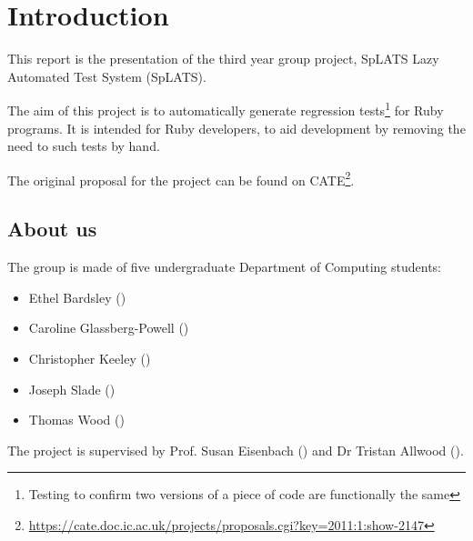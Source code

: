 \chapter{Introduction}

This report is the presentation of the third year group project, SpLATS Lazy Automated Test System (SpLATS).

The aim of this project is to automatically generate regression tests\footnote{Testing to confirm two versions of a piece of code are functionally the same} for Ruby programs.
It is intended for Ruby developers, to aid development by removing the need to such tests by hand.

The original proposal for the project can be found on CATE\footnote{\url{https://cate.doc.ic.ac.uk/projects/proposals.cgi?key=2011:1:show-2147}}.

\section{About us}
  The group is made of five undergraduate Department of Computing students:
  \begin{itemize}
    \item{Ethel Bardsley ()}
    \item{Caroline Glassberg-Powell ()}
    \item{Christopher Keeley ()}
    \item{Joseph Slade ()}
    \item{Thomas Wood ()}
  \end{itemize}

  The project is supervised by Prof. Susan Eisenbach () and Dr Tristan Allwood ().
